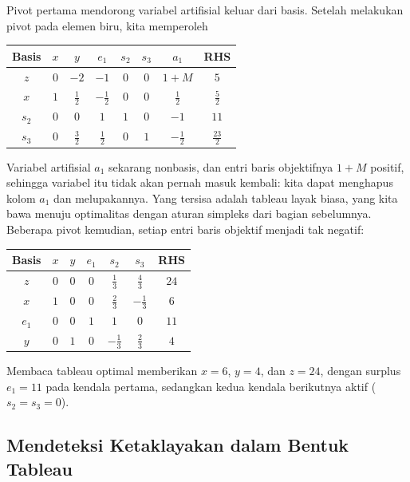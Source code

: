 \medskip
Pivot pertama mendorong variabel artifisial keluar dari basis. Setelah
melakukan pivot pada elemen biru, kita memperoleh
\begin{center}
\renewcommand{\arraystretch}{1.3}\small\setlength{\tabcolsep}{4.5pt}
\begin{tabular}{c|cccccc|c}
\toprule
Basis & $x$ & $y$ & $e_1$ & $s_2$ & $s_3$ & $a_1$ & RHS\\
\midrule
$z$   & $0$ & $-2$ & $-1$ & $0$ & $0$ & $1+M$ & $5$\\
\midrule
$x$   & $1$ & $\tfrac12$ & $-\tfrac12$ & $0$ & $0$ & $\tfrac12$ & $\tfrac52$\\
$s_2$ & $0$ & $0$ & $1$ & $1$ & $0$ & $-1$ & $11$\\
$s_3$ & $0$ & $\tfrac32$ & $\tfrac12$ & $0$ & $1$ & $-\tfrac12$ & $\tfrac{23}{2}$\\
\bottomrule
\end{tabular}
\end{center}
Variabel artifisial $a_1$ sekarang nonbasis, dan entri baris objektifnya $1+M$
positif, sehingga variabel itu tidak akan pernah masuk kembali: kita dapat
menghapus kolom $a_1$ dan melupakannya. Yang tersisa adalah tableau layak biasa,
yang kita bawa menuju optimalitas dengan aturan simpleks dari bagian sebelumnya.
Beberapa pivot kemudian, setiap entri baris objektif menjadi tak negatif:
\begin{center}
\renewcommand{\arraystretch}{1.3}\small\setlength{\tabcolsep}{4.5pt}
\begin{tabular}{c|ccccc|c}
\toprule
Basis & $x$ & $y$ & $e_1$ & $s_2$ & $s_3$ & RHS\\
\midrule
\rowcolor{algopt!12}$z$ & $0$ & $0$ & $0$ & $\tfrac13$ & $\tfrac43$ & $24$\\
\midrule
$x$   & $1$ & $0$ & $0$ & $\tfrac23$  & $-\tfrac13$ & $6$\\
$e_1$ & $0$ & $0$ & $1$ & $1$         & $0$         & $11$\\
$y$   & $0$ & $1$ & $0$ & $-\tfrac13$ & $\tfrac23$  & $4$\\
\bottomrule
\end{tabular}
\end{center}
Membaca tableau optimal memberikan $x = 6$, $y = 4$, dan $z = 24$, dengan
surplus $e_1 = 11$ pada kendala pertama, sedangkan kedua kendala berikutnya
aktif ($s_2 = s_3 = 0$).

\subsection{Mendeteksi Ketaklayakan dalam Bentuk Tableau}

